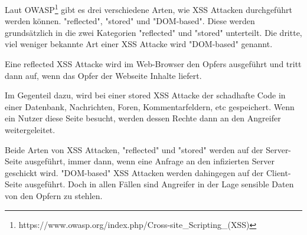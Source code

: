 Laut OWASP\footnote[3]{https://www.owasp.org/index.php/Cross-site_Scripting_(XSS)} gibt es drei verschiedene Arten, wie XSS Attacken durchgeführt werden können. "reflected", "stored" und "DOM-based". Diese werden grundsätzlich in die zwei Kategorien "reflected" und "stored" unterteilt. Die dritte, viel weniger bekannte Art einer XSS Attacke wird "DOM-based" genannt.

Eine reflected XSS Attacke wird im Web-Browser den Opfers ausgeführt und tritt dann auf, wenn das Opfer der Webseite Inhalte liefert.\autocite[2]{hydara2015a}

Im Gegenteil dazu, wird bei einer stored XSS Attacke der schadhafte Code in einer Datenbank, Nachrichten, Foren, Kommentarfeldern, etc gespeichert. Wenn ein Nutzer diese Seite besucht, werden dessen Rechte dann an den Angreifer weitergeleitet.\autocite[2]{hydara2015a}


Beide Arten von XSS Attacken, "reflected" und "stored" werden auf der Server-Seite ausgeführt, immer dann, wenn eine Anfrage an den infizierten Server geschickt wird. "DOM-based" XSS Attacken werden dahingegen auf der Client-Seite ausgeführt. Doch in allen Fällen sind Angreifer in der Lage sensible Daten von den Opfern zu stehlen.\autocite[2]{hydara2015a}

